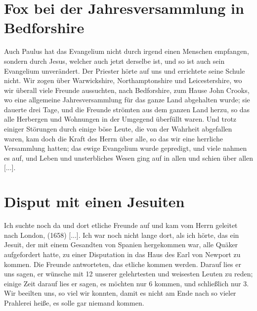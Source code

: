 \section{Fox bei der Jahresversammlung in Bedforshire}

Auch Paulus hat das Evangelium nicht durch irgend einen
Menschen empfangen, sondern durch Jesus, welcher auch jetzt
derselbe ist, und so ist auch sein Evangelium unverändert. Der
Priester hörte auf uns und errichtete seine Schule nicht.
Wir zogen über Warwickshire, 
Northamptonshire und
Leicestershire, wo wir überall viele Freunde 
aussuchten, nach Bedforshire, zum Hause 
John Crooks, wo eine allgemeine 
Jahresversammlung für das ganze 
Land abgehalten wurde; sie dauerte
drei Tage, und die Freunde strömten aus dem ganzen Land herzu,
so das alle Herbergen und Wohnungen in der Umgegend überfüllt 
waren. Und trotz einiger Störungen durch einige böse Leute,
die von der Wahrheit abgefallen waren, kam doch die Kraft des
Herrn über alle, so das wir eine herrliche Versammlung hatten;
das ewige Evangelium wurde gepredigt, und viele nahmen es
auf, und Leben und unsterbliches Wesen ging auf in allen und
schien über allen [...].

\section{Disput mit einen Jesuiten}

Ich suchte noch da und dort etliche Freunde auf und kam
vom Herrn geleitet nach London, (1658) [...].
Ich war noch nicht lange dort, als ich hörte, das 
ein Jesuit,
der mit einem Gesandten von Spanien hergekommen war, alle
Quäker aufgefordert hatte, zu einer Disputation 
in das Haus des Earl von Newport 
zu kommen. Die Freunde antworteten, das
etliche kommen werden. Darauf lies er uns sagen, er wünsche
mit 12 unserer gelehrtesten und weisesten Leuten zu reden; einige
Zeit darauf lies er sagen, es möchten nur 6 kommen, und schließlich
nur 3. Wir beeilten uns, so viel wir konnten, damit es nicht am
Ende nach so vieler Prahlerei heiße, es solle gar niemand kommen.



